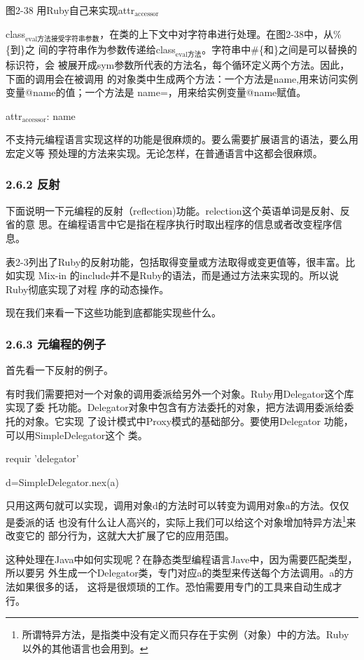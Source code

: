 \documentclass[11pt]{ctexart}
\begin{document}
图2-38 用Ruby自己来实现attr\(_{\text{accessor}}\)

class\(_{\text{eval方法接受字符串参数}}\)，在类的上下文中对字符串进行处理。在图2-38中，从\%\{到\}之
间的字符串作为参数传递给class\(_{\text{eval方法}}\)。字符串中\#\{和\}之间是可以替换的标识符，会
被展开成sym参数所代表的方法名，每个循环定义两个方法。因此，下面的调用会在被调用
的对象类中生成两个方法：一个方法是name,用来访问实例变量@name的值；一个方法是
name=，用来给实例变量@name赋值。

attr\(_{\text{accessor}}\): name

不支持元编程语言实现这样的功能是很麻烦的。要么需要扩展语言的语法，要么用宏定义等
预处理的方法来实现。无论怎样，在普通语言中这都会很麻烦。
\subsubsection{2.6.2 反射}
\label{sec:org73b3889}

下面说明一下元编程的反射（reflection)功能。relection这个英语单词是反射、反省的意
思。在编程语言中它是指在程序执行时取出程序的信息或者改变程序信息。

表2-3列出了Ruby的反射功能，包括取得变量或方法取得或变更值等，很丰富。比如实现
Mix-in 的include并不是Ruby的语法，而是通过方法来实现的。所以说Ruby彻底实现了对程
序的动态操作。

现在我们来看一下这些功能到底都能实现些什么。
\subsubsection{2.6.3 元编程的例子}
\label{sec:orgd0d3f03}

首先看一下反射的例子。

有时我们需要把对一个对象的调用委派给另外一个对象。Ruby用Delegator这个库实现了委
托功能。Delegator对象中包含有方法委托的对象，把方法调用委派给委托的对象。它实现
了设计模式中Proxy模式的基础部分。要使用Delegator 功能，可以用SimpleDelegator这个
类。

requir 'delegator'

d=SimpleDelegator.nex(a)

只用这两句就可以实现，调用对象d的方法时可以转变为调用对象a的方法。仅仅是委派的话
也没有什么让人高兴的，实际上我们可以给这个对象增加特异方法\footnote{所谓特异方法，是指类中没有定义而只存在于实例（对象）中的方法。Ruby
以外的其他语言也会用到。}来改变它的
部分行为，这就大大扩展了它的应用范围。

这种处理在Java中如何实现呢？在静态类型编程语言Jave中，因为需要匹配类型，所以要另
外生成一个Delegator类，专门对应a的类型来传送每个方法调用。a的方法如果很多的话，
这将是很烦琐的工作。恐怕需要用专门的工具来自动生成才行。
\end{document}
